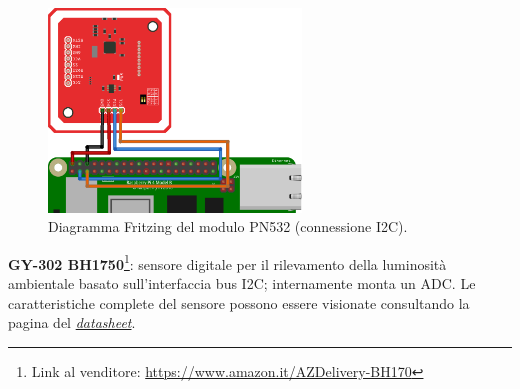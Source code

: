 \begin{figure}[H]
    \begin{center}
      \includegraphics[width=0.6\textwidth]{images/sensors/pn532-fritzing.png}
    \end{center}
    \caption{\label{pn532-diagram}Diagramma Fritzing del modulo PN532 (connessione I2C).}
\end{figure}
    
    
\textbf{GY-302 BH1750}\footnote{Link al venditore: \href{https://www.amazon.it/AZDelivery-Sensore-Intensità-Luminosità-Raspberry/dp/B07NLL4SCB}{https://www.amazon.it/AZDelivery-BH170}}: sensore digitale per il rilevamento della luminosità ambientale basato sull'interfaccia bus I2C; internamente monta un ADC. Le caratteristiche complete del sensore possono essere visionate consultando la pagina del \href{https://www.mouser.com/datasheet/2/348/bh1750fvi-e-186247.pdf}{\textit{datasheet}}. 

